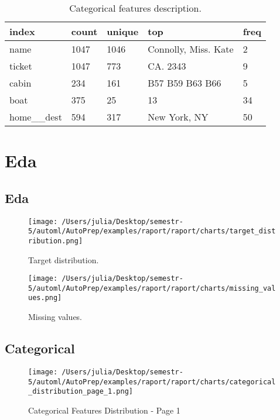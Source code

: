 \documentclass{article}%
\begin{document}
%


\begin{table}[H]%
\begin{center}%
\begin{tabular}{l l l l l}%
\hline%
\textbf{index}&\textbf{count}&\textbf{unique}&\textbf{top}&\textbf{freq}\\%
\hline%
name&1047&1046&Connolly, Miss. Kate&2\\%
ticket&1047&773&CA. 2343&9\\%
cabin&234&161&B57 B59 B63 B66&5\\%
boat&375&25&13&34\\%
home\_\_dest&594&317&New York, NY&50\\%
\hline%
\end{tabular}%
\end{center}%
\caption{Categorical features description.}%
\end{table}

%
\section{Eda}%
\label{sec:Eda}%

%
\subsection{Eda}%
\label{subsec:Eda}%

%


\begin{figure}[H]%
\centering%
\texttt{[image: /Users/julia/Desktop/semestr-5/automl/AutoPrep/examples/raport/raport/charts/target\_distribution.png]}%
\caption{Target distribution.}%
\end{figure}

%


\begin{figure}[H]%
\centering%
\texttt{[image: /Users/julia/Desktop/semestr-5/automl/AutoPrep/examples/raport/raport/charts/missing\_values.png]}%
\caption{Missing values.}%
\end{figure}

%
\subsection{Categorical}%
\label{subsec:Categorical}%

%


\begin{figure}[H]%
\centering%
\texttt{[image: /Users/julia/Desktop/semestr-5/automl/AutoPrep/examples/raport/raport/charts/categorical\_distribution\_page\_1.png]}%
\caption{Categorical Features Distribution {-} Page 1}%
\end{figure}
\end{document}
